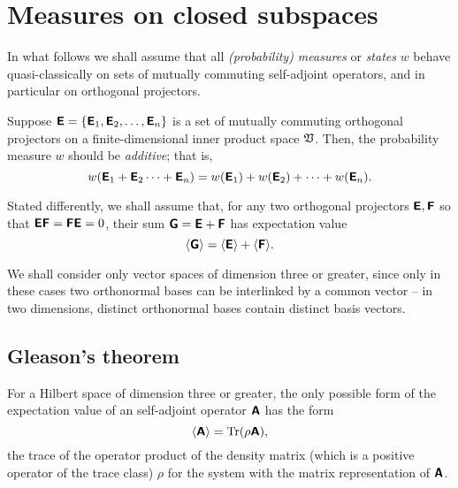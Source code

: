 \section{Measures on closed subspaces}

In what follows we shall assume that all {\em (probability) measures}
or {\em states} $w$
behave quasi-classically on sets of mutually commuting self-adjoint operators,
and in particular on orthogonal projectors.

Suppose
 $\textsf{\textbf{E}}
=
\{
\textsf{\textbf{E}}_1,
\textsf{\textbf{E}}_2,
\ldots ,
\textsf{\textbf{E}}_n
\}
$
is a set of mutually commuting orthogonal projectors
on a finite-dimensional inner product space   ${\frak V}$.
Then, the probability measure $w$ should be {\em additive}; that is,
\begin{equation}
w(\textsf{\textbf{E}}_1+\textsf{\textbf{E}}_2\cdots +\textsf{\textbf{E}}_n)=
w(\textsf{\textbf{E}}_1)+
w(\textsf{\textbf{E}}_2)+
\cdots +
w(\textsf{\textbf{E}}_n).
\end{equation}

Stated differently, we shall assume that,
for any two orthogonal projectors $ \textsf{\textbf{E}},\textsf{\textbf{F}}$
so that
 $ \textsf{\textbf{E}}\textsf{\textbf{F}}= \textsf{\textbf{F}}\textsf{\textbf{E}}=0$,
their sum
 $  \textsf{\textbf{G}} =\textsf{\textbf{E}}+\textsf{\textbf{F}}$
has expectation value
\begin{equation}
\langle \textsf{\textbf{G}}\rangle =
\langle \textsf{\textbf{E}} \rangle +
\langle \textsf{\textbf{F}} \rangle.
\end{equation}

We shall consider only vector spaces of dimension three or greater, since only in these cases two  orthonormal bases can be interlinked by a common vector -- in two dimensions,
distinct orthonormal bases contain distinct basis vectors.

\subsection{Gleason's theorem}

For a Hilbert space of dimension three or greater,
the only possible form of the  expectation value
of an self-adjoint operator  $\textsf{\textbf{A}}$
has the form
\cite{Gleason,r:dvur-93,pitowsky:218,rich-bridge,peres}
\begin{equation}
\langle
\textsf{\textbf{A}}
\rangle
=
\textrm{Tr}({  \rho} \textsf{\textbf{A}}),
\end{equation}
the trace of the operator product of the  density matrix (which is a positive operator of the trace class)
${  \rho}$
for the system with the matrix representation of $\textsf{\textbf{A}}$.

